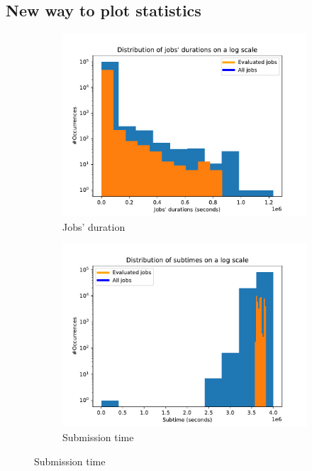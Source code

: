 \documentclass[a4paper]{article}
\begin{document}
\subsection{New way to plot statistics}

\begin{figure}[H]\centering
\begin{subfigure}[b]{0.4\linewidth}\centering\includegraphics[width=1\linewidth]{MBSS/plot/Distribution/2022-01-17->2022-01-19_delay.pdf}\caption{Jobs' duration}\label{38}\end{subfigure}
\begin{subfigure}[b]{0.4\linewidth}\centering\includegraphics[width=1\linewidth]{MBSS/plot/Distribution/2022-01-17->2022-01-19_subtime.pdf}\caption{Submission time}\label{39}\end{subfigure}

\end{figure}
\end{document}

